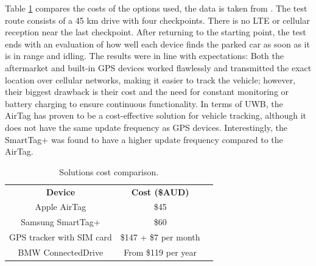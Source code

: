 \documentclass[english]{article}
\begin{document}
\begin{itemize}
  Table \ref{vehicles} compares the costs of the options used, the data is taken from \cite{Maric2023}. The test route consists of a 45 km drive with four checkpoints. There is no LTE or cellular reception near the last checkpoint. After returning to the starting point, the test ends with an evaluation of how well each device finds the parked car as soon as it is in range and idling. The results were in line with expectations: Both the aftermarket and built-in GPS devices worked flawlessly and transmitted the exact location over cellular networks, making it easier to track the vehicle; however, their biggest drawback is their cost and the need for constant monitoring or battery charging to ensure continuous functionality. In terms of UWB, the AirTag has proven to be a cost-effective solution for vehicle tracking, although it does not have the same update frequency as GPS devices. Interestingly, the SmartTag+ was found to have a higher update frequency compared to the AirTag.
  \begin{table}[h] 
    \caption{Solutions cost comparison.}
      \centering
      \begin{tabular}{|c|c|c}
        \cline{1-2}
        \textbf{Device}           & \textbf{Cost (\$AUD)}  &  \\ \cline{1-2}
        Apple AirTag              & \$45                   &  \\ \cline{1-2}
        Samsung SmartTag+         & \$60                   &  \\ \cline{1-2}
        GPS tracker with SIM card & \$147 + \$7 per month &  \\ \cline{1-2}
        BMW ConnectedDrive        & From \$119 per year    &  \\ \cline{1-2}
        \end{tabular}
        \label{vehicles}
      \end{table}


\end{itemize}
\end{document}
